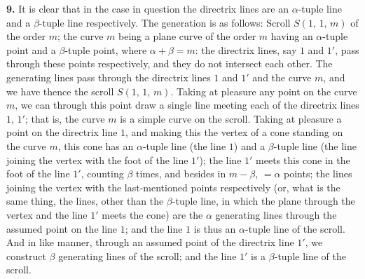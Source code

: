 \documentclass[11pt,a4paper]{article}
\begin{document}
\textbf{9.} It is clear that in the case in question the directrix lines are an $\alpha$-tuple line and a $\beta$-tuple line respectively. The generation is as follows: Scroll $S(1,\,1,\,m)$ of the order $m$; the curve $m$ being a plane curve of the order $m$ having an $\alpha$-tuple point and a $\beta$-tuple point, where $\alpha + \beta = m$: the directrix lines, say $1$ and $1'$, pass through these points respectively, and they do not intersect each other. The generating lines pass through the directrix lines $1$ and $1'$ and the curve $m$, and we have thence the scroll $S(1,\,1,\,m)$. Taking at pleasure any point on the curve $m$, we can through this point draw a single line meeting each of the directrix lines $1,\,1'$; that is, the curve $m$ is a simple curve on the scroll. Taking at pleasure a point on the directrix line $1$, and making this the vertex of a cone standing on the curve $m$, this cone has an $\alpha$-tuple line (the line $1$) and a $\beta$-tuple line (the line joining the vertex with the foot of the line $1'$); the line $1'$ meets this cone in the foot of the line $1'$, counting $\beta$ times, and besides in $m - \beta$, $= \alpha$ points; the lines joining the vertex with the last-mentioned points respectively (or, what is the same thing, the lines, other than the $\beta$-tuple line, in which the plane through the vertex and the line $1'$ meets the cone) are the $\alpha$ generating lines through the assumed point on the line $1$; and the line $1$ is thus an $\alpha$-tuple line of the scroll. And in like manner, through an assumed point of the directrix line $1'$, we construct $\beta$ generating lines of the scroll; and the line $1'$ is a $\beta$-tuple line of the scroll.

\medskip
\end{document}
